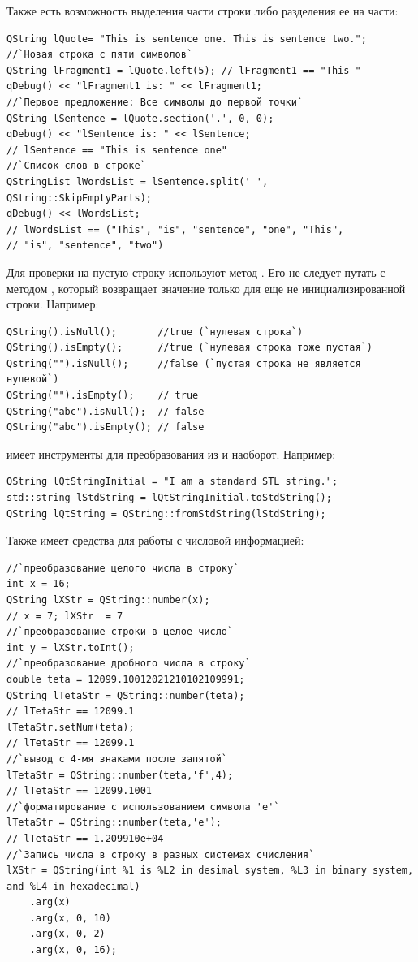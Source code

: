 Также есть возможность выделения части строки либо разделения ее на части:
\begin{lstlisting}
QString lQuote= "This is sentence one. This is sentence two.";
//`Новая строка с пяти символов`
QString lFragment1 = lQuote.left(5); // lFragment1 == "This "
qDebug() << "lFragment1 is: " << lFragment1;
//`Первое предложение: Все символы до первой точки`
QString lSentence = lQuote.section('.', 0, 0);
qDebug() << "lSentence is: " << lSentence;
// lSentence == "This is sentence one"
//`Cписок слов в строке`
QStringList lWordsList = lSentence.split(' ', QString::SkipEmptyParts);
qDebug() << lWordsList;
// lWordsList == ("This", "is", "sentence", "one", "This",
// "is", "sentence", "two")
\end{lstlisting}

Для проверки на пустую строку используют метод . Его не следует путать с
методом , который возвращает значение  только для еще не
инициализированной строки. Например:
\begin{lstlisting}
QString().isNull();       //true (`нулевая строка`)
QString().isEmpty();      //true (`нулевая строка тоже пустая`)
Qstring("").isNull();     //false (`пустая строка не является нулевой`)
QString("").isEmpty();    // true
QString("abc").isNull();  // false
QString("abc").isEmpty(); // false
\end{lstlisting}

 имеет инструменты для преобразования из  и наоборот.
Например:
\begin{lstlisting}
QString lQtStringInitial = "I am a standard STL string.";
std::string lStdString = lQtStringInitial.toStdString();
QString lQtString = QString::fromStdString(lStdString);
\end{lstlisting}

Также  имеет  средства для работы с числовой информацией:
\begin{lstlisting}
//`преобразование целого числа в строку`
int x = 16;
QString lXStr = QString::number(x);
// x = 7; lXStr  = 7
//`преобразование строки в целое число`
int y = lXStr.toInt();
//`преобразование дробного числа в строку`
double teta = 12099.10012021210102109991;
QString lTetaStr = QString::number(teta);
// lTetaStr == 12099.1
lTetaStr.setNum(teta);
// lTetaStr == 12099.1
//`вывод с 4-мя знаками после запятой`
lTetaStr = QString::number(teta,'f',4);
// lTetaStr == 12099.1001
//`форматирование с использованием символа 'e'`
lTetaStr = QString::number(teta,'e');
// lTetaStr == 1.209910e+04
//`Запись числа в строку в разных системах счисления`
lXStr = QString(int %1 is %L2 in desimal system, %L3 in binary system, and %L4 in hexadecimal)
    .arg(x)
    .arg(x, 0, 10)
    .arg(x, 0, 2)
    .arg(x, 0, 16);
\end{lstlisting}

